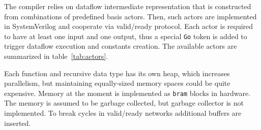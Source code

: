 The compiler relies on dataflow intermediate representation that is constructed from combinations of predefined basis actors. Then, such actors are implemented in SystemVerilog and cooperate via valid/ready protocol. Each actor is required to have at least one input and one output, thus a special \texttt{Go} token is added to trigger dataflow execution and constants creation. The available actors are summarized in table~\ref{tab:actors}.

Each function and recursive data type has its own heap, which increases parallelism, but maintaining equally-sized memory spaces could be quite expensive. Memory at the moment is implemented as \texttt{bram} blocks in hardware. The memory is assumed to be garbage collected, but garbage collector is not implemented. To break cycles in valid/ready networks additional buffers are inserted.

